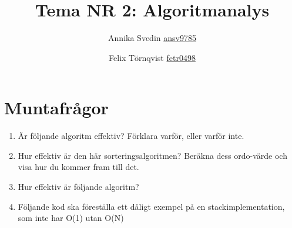 \documentclass[a5paper,10pt,oneside]{article}
\title{Tema NR 2: Algoritmanalys}
\author{Annika Svedin \url{ansv9785} \and Felix Törnqvist \url{fetr0498}}
\begin{document}
\maketitle

\section*{Muntafrågor}

\begin{enumerate}

\item Är följande algoritm effektiv? Förklara varför, eller varför inte. 




\item Hur effektiv är den här sorteringsalgoritmen? Beräkna dess ordo-värde och visa hur du kommer fram till det.




\item Hur effektiv är följande algoritm?


\item Följande kod ska föreställa ett dåligt exempel på en stackimplementation, som inte har O(1) utan O(N)



\end{enumerate}
\end{document}
